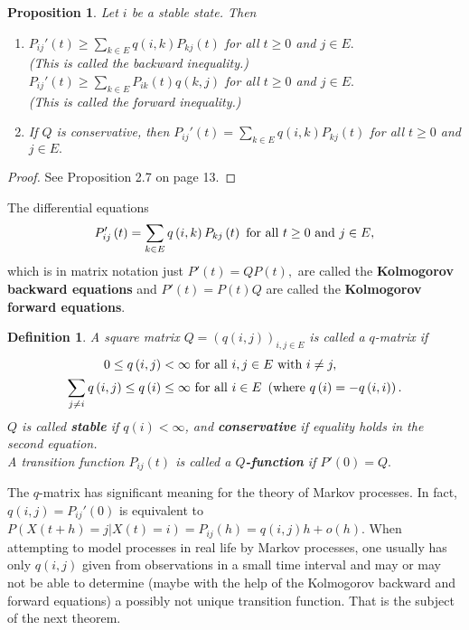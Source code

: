 \documentclass[12pt,a4paper]{scrartcl}
\newtheorem{definition}[theorem]{Definition}
\newtheorem{proposition}[theorem]{Proposition}
\numberwithin{equation}{section}
\begin{document}
\begin{proposition}
Let $i$ be a stable state. Then
\begin{enumerate}[(1)]
\item $P_{ij}'\left(t\right) \geq \sum_{k \in E} q\left(i,k\right) P_{kj}\left(t\right)$ for all $t\geq0$ and $j\in E.$ \\
(This is called the backward inequality.) \\
$P_{ij}'\left(t\right) \geq \sum_{k \in E} P_{ik}\left(t\right) q\left(k,j\right) $ for all $t\geq0$ and $j\in E.$ \\
(This is called the forward inequality.)
\item If $Q$ is conservative, then $P_{ij}'\left(t\right) = \sum_{k \in E} q\left(i,k\right) P_{kj}\left(t\right)$ for all $t\geq0$ and $j \in E.$
\end{enumerate}
\end{proposition}
\begin{proof}
See \cite{anderson} Proposition 2.7 on page 13.
\end{proof}

The differential equations 
$$ P_{ij}'\left(t\right) = \sum_{k \in E} q\left(i,k\right) P_{kj}\left(t\right) \textnormal{ for all } t\geq0 \textnormal{ and } j\in E,$$
which is in matrix notation just $P'\left(t\right) = Q P\left(t\right),$ are called the \textbf{Kolmogorov backward equations} and $P'\left(t\right) = P\left(t\right)Q$ are called the \textbf{Kolmogorov forward equations}.

\begin{definition}
A square matrix $ Q = \left(q\left(i,j\right)\right)_{i,j \in E} $ is called a $q$-matrix if
\begin{align*}
0 \leq q\left(i,j\right) < \infty & \textnormal{ for all } i,j \in E \textnormal{ with } i \neq j, \\
\sum_{j \neq i} q\left(i,j\right) \leq q\left(i\right) \leq \infty &\textnormal{ for all } i \in E \ \left(\textnormal{where } q\left(i\right) = -q\left(i,i\right)\right).
\end{align*}
$Q$ is called \textbf{stable} if $q\left(i\right) <  \infty$, and \textbf{conservative} if equality holds in the second equation. \\
A transition function $P_{ij}\left(t\right)$ is called a \textbf{$Q$-function} if $P'\left(0\right) = Q.$
\end{definition}

The $q$-matrix has significant meaning for the theory of Markov processes. In fact, $q\left(i,j\right) = P_{ij}'\left(0\right) $ is equivalent to $ P\left(X\left(t+h\right) = j | X\left(t\right) = i \right) = P_{ij}\left(h\right) = q\left(i,j\right)h + o\left(h\right).$ When attempting to model processes in real life by Markov processes, one usually has only $q\left(i,j\right)$ given from observations in a small time interval and may or may not be able to determine (maybe with the help of the Kolmogorov backward and forward equations) a possibly not unique transition function. That is the subject of the next theorem.
\end{document}
